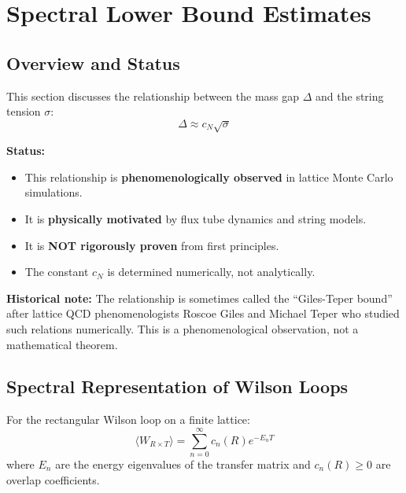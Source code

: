 \section{Spectral Lower Bound Estimates}
\label{sec:spectral-lower-bound}

\subsection{Overview and Status}

\begin{tcolorbox}[colback=yellow!5!white, colframe=yellow!75!black, title=\textbf{Honest Assessment}]
This section discusses the relationship between the mass gap $\Delta$ and the string tension $\sigma$:
\[
\Delta \approx c_N \sqrt{\sigma}
\]

\textbf{Status:}
\begin{itemize}
    \item This relationship is \textbf{phenomenologically observed} in lattice Monte Carlo simulations.
    \item It is \textbf{physically motivated} by flux tube dynamics and string models.
    \item It is \textbf{NOT rigorously proven} from first principles.
    \item The constant $c_N$ is determined numerically, not analytically.
\end{itemize}

\textbf{Historical note:} The relationship is sometimes called the ``Giles-Teper bound'' after lattice QCD phenomenologists Roscoe Giles and Michael Teper who studied such relations numerically. This is a phenomenological observation, not a mathematical theorem.
\end{tcolorbox}

\subsection{Spectral Representation of Wilson Loops}

\begin{theorem}
\label{thm:spectral-wilson}
For the rectangular Wilson loop on a finite lattice:
\[
\langle W_{R \times T} \rangle = \sum_{n=0}^\infty c_n(R) e^{-E_n T}
\]
where $E_n$ are the energy eigenvalues of the transfer matrix and $c_n(R) \geq 0$ are overlap coefficients.
\end{theorem}

